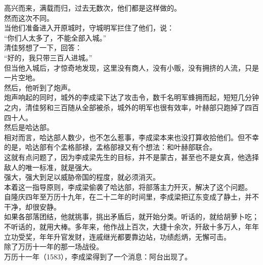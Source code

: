 \begin{multicols}{\theparacolNo}
高兴而来，满载而归，过去无数次，他们都是这样做的。\\

然而这次不同。\\

当他们准备进入开原城时，守城明军拦住了他们，说：\\

“你们人太多了，不能全部入城。”\\

清佳努想了一下，回答：\\

“好的，我只带三百人进城。”\\

但当他入城后，才惊奇地发现，这里没有商人，没有小贩，没有拥挤的人流，只是一片空地。\\

然后，他听到了炮声。\\

炮声响起的同时，城外的李成梁下达了攻击令，数千名明军蜂拥而起，短短几分钟之内，清佳努和三百随从全部被杀，城外的明军也很有效率，叶赫部只跑掉了四百四十人。\\

然后是哈达部。\\

相对而言，哈达部人数少，也不怎么惹事，李成梁本来也没打算收拾他们。但不幸的是，哈达部有个孟格部禄，孟格部禄又有个想法：和叶赫部联合。\\

这就有点问题了，因为李成梁先生的目标，并不是蒙古，甚至也不是女真，他选择敌人的唯一标准，就是强大。\\

强大，强大到足以威胁帝国的程度，就必须消灭。\\

本着这一指导原则，李成梁偷袭了哈达部，将部落主力歼灭，解决了这个问题。\\

自隆庆四年至万历十九年，在二十二年的时间里，李成梁把辽东变成了静土，并不干净，却很安静。\\

如果各部落团结，他就挑事，挑出矛盾后，就开始分类。听话的，就给胡萝卜吃；不听话的，就用大棒。多年来，他作战上百次，大捷十余次，歼敌十多万人，年年立功受奖，年年升官发财，连戚继光都要靠边站，功绩彪炳，无懈可击。\\

除了万历十一年的那一场战役。\\

万历十一年（1583），李成梁得到了一个消息：阿台出现了。\\


\end{multicols}
